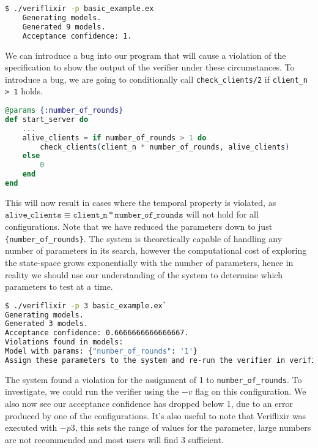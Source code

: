 \begin{lstlisting}[language=bash, xleftmargin=.1\linewidth]
    $ ./veriflixir -p basic_example.ex 
    Generating models.
    Generated 9 models.
    Acceptance confidence: 1.
\end{lstlisting}
We can introduce a bug into our program that will cause a violation of the specification to show the output of the verifier under these circumstances. To introduce a bug, we are going to conditionally call \texttt{check\_clients/2} if \texttt{client\_n > 1} holds.
\begin{lstlisting}[language=Elixir, xleftmargin=.1\linewidth]
@params {:number_of_rounds}
def start_server do
    ...
    alive_clients = if number_of_rounds > 1 do
        check_clients(client_n * number_of_rounds, alive_clients)
    else
        0
    end
end
\end{lstlisting}
This will now result in cases where the temporal property is violated, as $\texttt{alive\_clients} \equiv \texttt{client\_n} * \texttt{number\_of\_rounds}$ will not hold for all configurations. Note that we have reduced the parameters down to just \texttt{\{number\_of\_rounds\}}. The system is theoretically capable of handling any number of parameters in its search, however the computational cost of exploring the state-space grows exponentially with the number of parameters, hence in reality we should use our understanding of the system to determine which parameters to test at a time.
\begin{lstlisting}[language=bash, xleftmargin=.1\linewidth]
$ ./veriflixir -p 3 basic_example.ex`
Generating models.
Generated 3 models.
Acceptance confidence: 0.6666666666666667.
Violations found in models:
Model with params: {"number_of_rounds": '1'}
Assign these parameters to the system and re-run the verifier in verification mode to gather a trace.
\end{lstlisting}
The system found a violation for the assignment of 1 to \texttt{number\_of\_rounds}. To investigate, we could run the verifier using the $-v$ flag on this configuration. We also now see our acceptance confidence has dropped below 1, due to an error produced by one of the configurations. It's also useful to note that Veriflixir was executed with $-p 3$, this sets the range of values for the parameter, large numbers are not recommended and most users will find 3 sufficient. 
